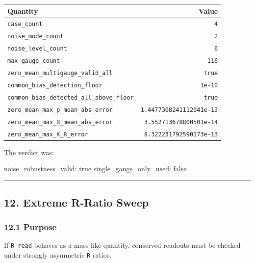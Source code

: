 \documentclass[
  a4paper,
]{article}
\newenvironment{Shaded}{}{}
\newcommand{\NormalTok}[1]{#1}
\newcounter{none} %
\begin{document}
{\def\LTcaptype{none} %
\begin{longtable}[]{@{}lr@{}}
\toprule\noalign{}
Quantity & Value \\
\midrule\noalign{}
\endhead
\bottomrule\noalign{}
\endlastfoot
\texttt{case\_count} & \texttt{4} \\
\texttt{noise\_mode\_count} & \texttt{2} \\
\texttt{noise\_level\_count} & \texttt{6} \\
\texttt{max\_gauge\_count} & \texttt{116} \\
\texttt{zero\_mean\_multigauge\_valid\_all} & \texttt{true} \\
\texttt{common\_bias\_detection\_floor} & \texttt{1e-10} \\
\texttt{common\_bias\_detected\_all\_above\_floor} & \texttt{true} \\
\texttt{zero\_mean\_max\_p\_mean\_abs\_error} &
\texttt{1.4477308241112041e-13} \\
\texttt{zero\_mean\_max\_R\_mean\_abs\_error} &
\texttt{3.552713678800501e-14} \\
\texttt{zero\_mean\_max\_K\_R\_error} &
\texttt{8.322231792590173e-13} \\
\end{longtable}
}

The verdict was:

\begin{Shaded}
\begin{Highlighting}[]
\NormalTok{noise\_robustness\_valid: true}
\NormalTok{single\_gauge\_only\_used: false}
\end{Highlighting}
\end{Shaded}

\begin{center}\rule{0.5\linewidth}{0.5pt}\end{center}

\subsection{12. Extreme R-Ratio Sweep}\label{extreme-r-ratio-sweep}

\subsubsection{12.1 Purpose}\label{purpose-3}

If \texttt{R\_read} behaves as a mass-like quantity, conserved readouts
must be checked under strongly asymmetric \texttt{R} ratios.
\end{document}
